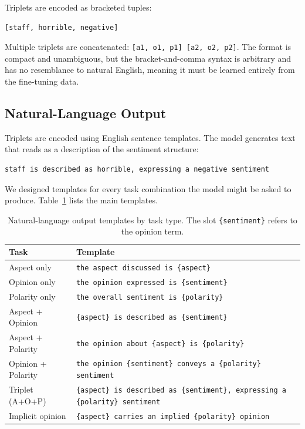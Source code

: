 \documentclass[12pt,a4paper]{report}
\begin{document}
Triplets are encoded as bracketed tuples:

\begin{lstlisting}
[staff, horrible, negative]
\end{lstlisting}

Multiple triplets are concatenated: \texttt{[a1, o1, p1] [a2, o2, p2]}. The format is compact and unambiguous, but the bracket-and-comma syntax is arbitrary and has no resemblance to natural English, meaning it must be learned entirely from the fine-tuning data.

\subsection{Natural-Language Output}\label{sec:nl-templates}

Triplets are encoded using English sentence templates. The model generates text that reads as a description of the sentiment structure:

\begin{lstlisting}
staff is described as horrible, expressing a negative sentiment
\end{lstlisting}

We designed templates for every task combination the model might be asked to produce. Table~\ref{tab:nl-templates} lists the main templates.

\begin{table}[H]
\centering
\caption{Natural-language output templates by task type. The slot \texttt{\{sentiment\}} refers to the opinion term.}
\label{tab:nl-templates}
\small
\begin{tabular}{@{}lp{11cm}@{}}
\toprule
\textbf{Task} & \textbf{Template} \\
\midrule
Aspect only & \texttt{the aspect discussed is \{aspect\}} \\
Opinion only & \texttt{the opinion expressed is \{sentiment\}} \\
Polarity only & \texttt{the overall sentiment is \{polarity\}} \\
\midrule
Aspect + Opinion & \texttt{\{aspect\} is described as \{sentiment\}} \\
Aspect + Polarity & \texttt{the opinion about \{aspect\} is \{polarity\}} \\
Opinion + Polarity & \texttt{the opinion \{sentiment\} conveys a \{polarity\} sentiment} \\
\midrule
Triplet (A+O+P) & \texttt{\{aspect\} is described as \{sentiment\}, expressing a \{polarity\} sentiment} \\
\midrule
Implicit opinion & \texttt{\{aspect\} carries an implied \{polarity\} opinion} \\
\bottomrule
\end{tabular}
\end{table}
\end{document}
